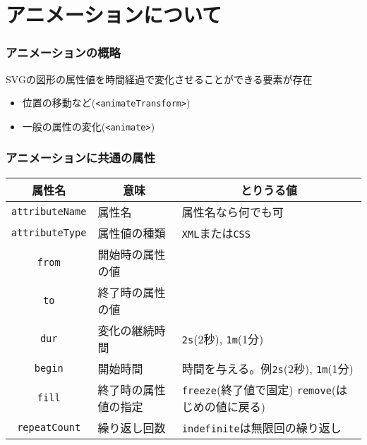 

\frame{\maketitle}
\section{アニメーションについて}
\begin{frame}[containsverbatim]
 \frametitle{アニメーションの概略}
 SVGの図形の属性値を時間経過で変化させることができる要素が存在
 \begin{itemize}
  \item 位置の移動など(\texttt{<animateTransform>})
  \item 一般の属性の変化(\texttt{<animate>})
\end{itemize}
\end{frame}
 \begin{frame}[containsverbatim]
  \frametitle{アニメーションに共通の属性}
  \footnotesize
  \begin{center}
   \begin{tabular}{|c|l|m{10em}|}\hline
 属性名&\multicolumn{1}{c|}{意味}&\multicolumn{1}{c|}{とりうる値} \\\hline
\texttt{attributeName}&属性名&属性名なら何でも可\\\hline
\texttt{attributeType}&属性値の種類&\texttt{XML}または\texttt{CSS}\\\hline
\texttt{from}&開始時の属性の値&\\\hline
\texttt{to}&終了時の属性の値&\\\hline
\texttt{dur}&変化の継続時間& \texttt{2s}(2秒), \texttt{1m}(1分)\\\hline
\texttt{begin}&開始時間&{時間を与える。例\texttt{2s}(2秒), \texttt{1m}(1分)}\\\hline
\texttt{fill}&終了時の属性値の指定&{\texttt{freeze}(終了値で固定)\newline
                \texttt{remove}(はじめの値に戻る)}\\\hline
\texttt{repeatCount}&繰り返し回数&
    {\texttt{indefinite}は無限回の繰り返し}\\\hline
   \end{tabular}
  \end{center}
 
 \end{frame}
